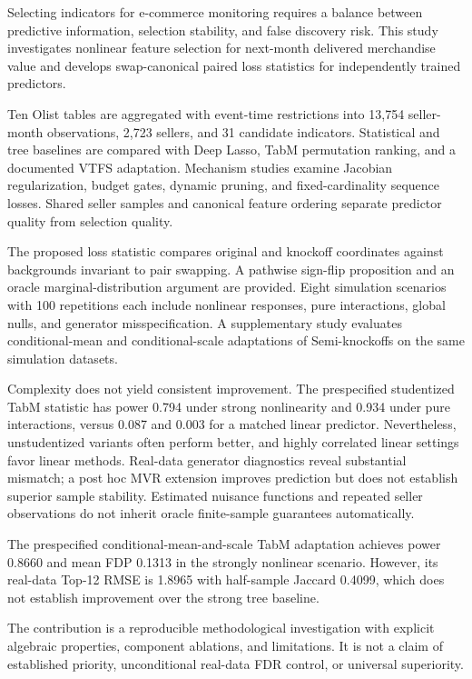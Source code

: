 \documentclass{sufethesismas}
\begin{document}
\begin{abstractEN}Selecting indicators for e-commerce monitoring requires a balance between predictive information, selection stability, and false discovery risk. This study investigates nonlinear feature selection for next-month delivered merchandise value and develops swap-canonical paired loss statistics for independently trained predictors.

Ten Olist tables are aggregated with event-time restrictions into 13,754 seller-month observations, 2,723 sellers, and 31 candidate indicators. Statistical and tree baselines are compared with Deep Lasso, TabM permutation ranking, and a documented VTFS adaptation. Mechanism studies examine Jacobian regularization, budget gates, dynamic pruning, and fixed-cardinality sequence losses. Shared seller samples and canonical feature ordering separate predictor quality from selection quality.

The proposed loss statistic compares original and knockoff coordinates against backgrounds invariant to pair swapping. A pathwise sign-flip proposition and an oracle marginal-distribution argument are provided. Eight simulation scenarios with 100 repetitions each include nonlinear responses, pure interactions, global nulls, and generator misspecification. A supplementary study evaluates conditional-mean and conditional-scale adaptations of Semi-knockoffs on the same simulation datasets.

Complexity does not yield consistent improvement. The prespecified studentized TabM statistic has power 0.794 under strong nonlinearity and 0.934 under pure interactions, versus 0.087 and 0.003 for a matched linear predictor. Nevertheless, unstudentized variants often perform better, and highly correlated linear settings favor linear methods. Real-data generator diagnostics reveal substantial mismatch; a post hoc MVR extension improves prediction but does not establish superior sample stability. Estimated nuisance functions and repeated seller observations do not inherit oracle finite-sample guarantees automatically.

The prespecified conditional-mean-and-scale TabM adaptation achieves power 0.8660 and mean FDP 0.1313 in the strongly nonlinear scenario. However, its real-data Top-12 RMSE is 1.8965 with half-sample Jaccard 0.4099, which does not establish improvement over the strong tree baseline.

The contribution is a reproducible methodological investigation with explicit algebraic properties, component ablations, and limitations. It is not a claim of established priority, unconditional real-data FDR control, or universal superiority.
\end{abstractEN}
\tableofcontents
\mainmatter
\end{document}
